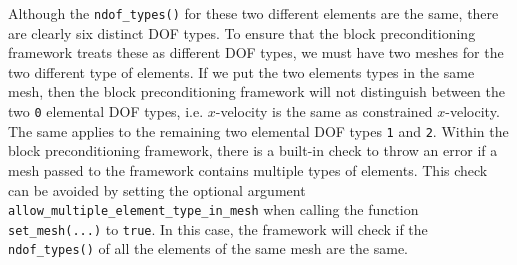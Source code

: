 Although the \texttt{ndof\_\allowbreak types()} for these two different elements are the same,
there are clearly six distinct DOF types. To ensure that the block 
preconditioning framework treats these as different DOF types, we must have two
meshes for the two different type of elements. If we put the two elements types
in the same mesh, then the block preconditioning framework will not distinguish
between the two \texttt{0} elemental DOF types, i.e. $x$-velocity is the same as 
constrained $x$-velocity. The same applies to the remaining two elemental 
DOF types \texttt{1} and \texttt{2}. Within the block preconditioning framework, 
there is a built-in check to throw an error if a mesh passed to the framework 
contains multiple types of elements. This check can be avoided by setting the 
optional argument 
\texttt{allow\_\allowbreak multiple\_\allowbreak element\_\allowbreak type\_\allowbreak in\_\allowbreak mesh} 
when calling the function \texttt{set\_\allowbreak mesh(...)} to \texttt{true}. 
In this case, the framework will check if the \texttt{ndof\_\allowbreak types()} 
of all the elements of the same mesh are the same.

